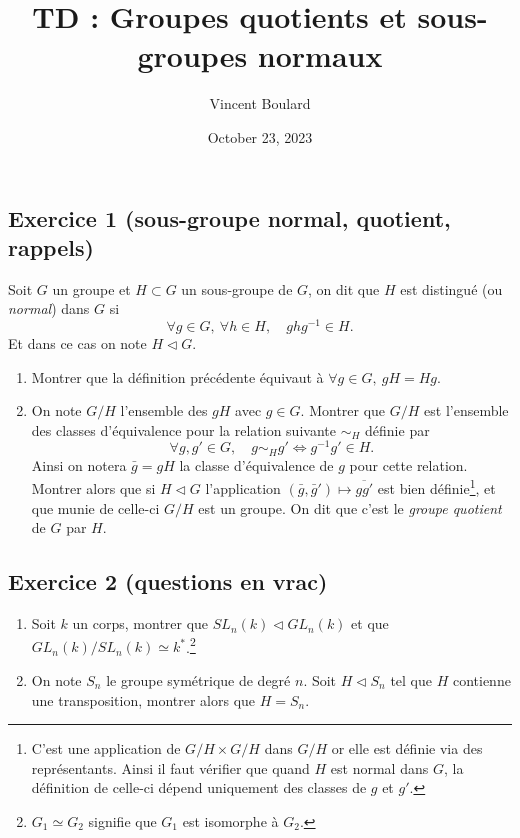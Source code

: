 \documentclass[11pt,a4paper]{article}
\title{TD : Groupes quotients et sous-groupes normaux}
\author{Vincent Boulard}
\date{October 23, 2023}
\newcommand{\normal}{\mathrel{\triangleleft}}
\begin{document}
\maketitle

\subsection*{Exercice 1 (sous-groupe normal, quotient, rappels)}
Soit $G$ un groupe et $H\subset G$ un sous-groupe de $G$, on dit que $H$ est distingué (ou \emph{normal}) dans $G$ si
\[
  \forall g\in G,\ \forall h\in H,\quad ghg^{-1}\in H.
\]
Et dans ce cas on note $H\normal G$.
\begin{enumerate}
  \item Montrer que la définition précédente équivaut à $\forall g\in G,\ gH=Hg$.
  \item On note $G/H$ l'ensemble des $gH$ avec $g\in G$. Montrer que $G/H$ est l'ensemble des classes d'équivalence pour la relation suivante $\sim_H$ définie par
  \[
    \forall g,g'\in G,\quad g\sim_H g' \Longleftrightarrow g^{-1}g'\in H.
  \]
  Ainsi on notera $\bar g=gH$ la classe d'équivalence de $g$ pour cette relation. Montrer alors que si $H\normal G$ l'application $(\bar g,\bar g')\mapsto \overline{gg'}$ est bien définie\footnote{C'est une application de $G/H\times G/H$ dans $G/H$ or elle est définie via des représentants. Ainsi il faut vérifier que quand $H$ est normal dans $G$, la définition de celle-ci dépend uniquement des classes de $g$ et $g'$.}, et que munie de celle-ci $G/H$ est un groupe. On dit que c'est le \emph{groupe quotient} de $G$ par $H$.
\end{enumerate}

\subsection*{Exercice 2 (questions en vrac)}
\begin{enumerate}
  \item Soit $k$ un corps, montrer que $SL_n(k)\normal GL_n(k)$ et que $GL_n(k)/SL_n(k)\simeq k^*$.\footnote{$G_1\simeq G_2$ signifie que $G_1$ est isomorphe à $G_2$.}
  \item On note $S_n$ le groupe symétrique de degré $n$. Soit $H\normal S_n$ tel que $H$ contienne une transposition, montrer alors que $H=S_n$.
\end{enumerate}
\end{document}
